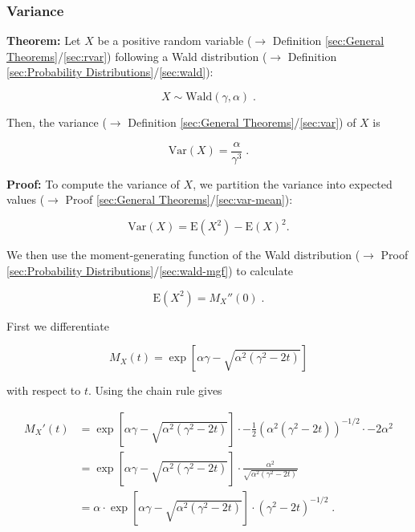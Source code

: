 \documentclass[a4paper,12pt,twoside]{book}
\begin{document}
\subsubsection[\textbf{Variance}]{Variance} \label{sec:wald-var}
\setcounter{equation}{0}

\textbf{Theorem:} Let $X$ be a positive random variable ($\rightarrow$ Definition \ref{sec:General Theorems}/\ref{sec:rvar}) following a Wald distribution ($\rightarrow$ Definition \ref{sec:Probability Distributions}/\ref{sec:wald}):

\begin{equation} \label{eq:wald-var-wald}
X \sim \mathrm{Wald}(\gamma, \alpha) \; .
\end{equation}

Then, the variance ($\rightarrow$ Definition \ref{sec:General Theorems}/\ref{sec:var}) of $X$ is

\begin{equation} \label{eq:wald-var-wald-var}
\mathrm{Var}(X) = \frac{\alpha}{\gamma^3} \; .
\end{equation}


\vspace{1em}
\textbf{Proof:} To compute the variance of $X$, we partition the variance into expected values ($\rightarrow$ Proof \ref{sec:General Theorems}/\ref{sec:var-mean}):

\begin{equation} \label{eq:wald-var-var-mean}
\mathrm{Var}(X) = \mathrm{E}(X^2)-\mathrm{E}(X)^2.
\end{equation}

We then use the moment-generating function of the Wald distribution ($\rightarrow$ Proof \ref{sec:Probability Distributions}/\ref{sec:wald-mgf}) to calculate

\begin{equation} \label{eq:wald-var-wald-moment}
\mathrm{E}(X^2) = M_X''(0) \; .
\end{equation}

First we differentiate

\begin{equation} \label{eq:wald-var-wald-mgf}
M_X(t) = \exp\left[\alpha \gamma - \sqrt{\alpha^2(\gamma^2-2t)}\right]
\end{equation}

with respect to $t$. Using the chain rule gives

\begin{equation} \label{eq:wald-var-wald-var-s1}
\begin{split}
  M_X'(t) &= \exp\left[\alpha \gamma - \sqrt{\alpha^2(\gamma^2-2t)}\right] \cdot -\frac{1}{2}\left(\alpha^2(\gamma^2-2t)\right)^{-1/2}\cdot -2\alpha^2 \\
          &= \exp\left[\alpha \gamma-\sqrt{\alpha^2(\gamma^2-2t)}\right] \cdot \frac{\alpha^2}{\sqrt{\alpha^2(\gamma^2-2t)}} \\
          &= \alpha \cdot \exp\left[\alpha \gamma -\sqrt{\alpha^2(\gamma^2-2t)}\right] \cdot (\gamma^2-2t)^{-1/2} \; .
\end{split}
\end{equation}
\end{document}
